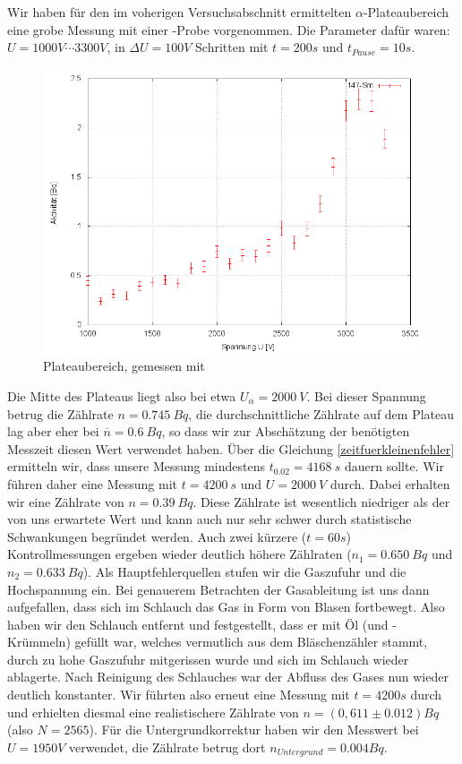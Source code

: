 Wir haben für den im voherigen Versuchsabschnitt ermittelten $\alpha$-Plateaubereich eine grobe Messung mit einer -Probe vorgenommen. Die Parameter dafür waren: $U= 1000V \cdots 3300V$, in $\Delta U = 100 V$ Schritten mit $t=200s$ und $t_{Pause} = 10s$.

\begin{figure}[H]
 \centering \includegraphics[width=0.9\linewidth]{Messwerte/plots/Sm147_plateau.png}
 \caption{Plateaubereich, gemessen mit }
\end{figure}

Die Mitte des Plateaus liegt also bei etwa $U_{\alpha} = 2000\ V$. Bei dieser Spannung betrug die Zählrate $n = 0.745\ Bq$, die durchschnittliche Zählrate auf dem Plateau lag aber eher bei $\overline{n} = 0.6\ Bq$, so dass wir zur Abschätzung der benötigten Messzeit diesen Wert verwendet haben. Über die Gleichung \ref{zeitfuerkleinenfehler} ermitteln wir, dass unsere Messung mindestens $t_{0.02} = 4168\ s$ dauern sollte. Wir führen daher eine Messung mit $t = 4200\ s$ und $ U = 2000\ V$ durch. Dabei erhalten wir eine Zählrate von $n = 0.39\ Bq$. Diese Zählrate ist wesentlich niedriger als der von uns erwartete Wert und kann auch nur sehr schwer durch statistische Schwankungen begründet werden. Auch zwei kürzere ($t = 60s$) Kontrollmessungen ergeben wieder deutlich höhere Zählraten ($n_1 = 0.650\ Bq$ und $n_2 = 0.633\ Bq$). Als Hauptfehlerquellen stufen wir die Gaszufuhr und die Hochspannung ein. Bei genauerem Betrachten der Gasableitung ist uns dann aufgefallen, dass sich im Schlauch das Gas in Form von Blasen fortbewegt. Also haben wir den Schlauch entfernt und festgestellt, dass er mit Öl (und -Krümmeln) gefüllt war, welches vermutlich aus dem Bläschenzähler stammt, durch zu hohe Gaszufuhr mitgerissen wurde und sich im Schlauch wieder ablagerte. Nach Reinigung des Schlauches war der Abfluss des Gases nun wieder deutlich konstanter. Wir führten also erneut eine Messung mit $t=4200s$ durch und erhielten diesmal eine realistischere Zählrate von $n = (0,611 \pm 0.012) Bq$ (also $N = 2565$). Für die Untergrundkorrektur haben wir den Messwert bei $U = 1950V$ verwendet, die Zählrate betrug dort $n_{Untergrund} = 0.004 Bq$.


